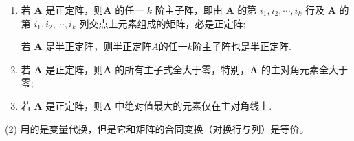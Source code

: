 \documentclass[../../main.tex]{subfiles}
\begin{document}
\begin{proposition}\label{proposition:正定阵的性质}
\begin{enumerate}[(1)]
\item 若 $\boldsymbol{A}$ 是正定阵，则$\boldsymbol{A}$ 的任一 $k$ 阶主子阵，即由 $\boldsymbol{A}$ 的第 $i_1,i_2,\cdots,i_k$ 行及 $\boldsymbol{A}$ 的第 $i_1,i_2,\cdots,i_k$ 列交点上元素组成的矩阵，必是正定阵;

若 $\boldsymbol{A}$ 是半正定阵，则半正定阵$A$的任一$k$阶主子阵也是半正定阵.

\item 若 $\boldsymbol{A}$ 是正定阵，则$\boldsymbol{A}$ 的所有主子式全大于零，特别，$\boldsymbol{A}$ 的主对角元素全大于零;

\item 若 $\boldsymbol{A}$ 是正定阵，则$\boldsymbol{A}$ 中绝对值最大的元素仅在主对角线上.
\end{enumerate} 
\end{proposition}
\begin{remark}
(2) 用的是变量代换，但是它和矩阵的合同变换（对换行与列）是等价。 
\end{remark}
\end{document}

